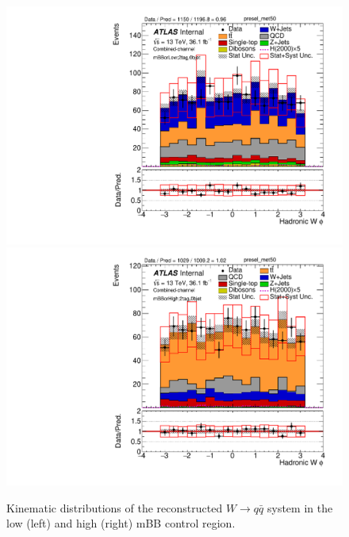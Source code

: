 \begin{figure}[!h]
\begin{center}
\includegraphics[scale=0.33]{./figures/boosted/PlotByMbbRegions/DataMC_2tag_0bjet_mbbcrLow_lepton_presel_met50_WhadPhi}                                                                             
\includegraphics[scale=0.33]{./figures/boosted/PlotByMbbRegions/DataMC_2tag_0bjet_mbbcrHigh_lepton_presel_met50_WhadPhi}                                                                            
\caption{Kinematic distributions of the reconstructed $W \to q\bar{q}$ system in the low (left) and high (right) mBB control region.}
\label{fig:boosted_mbbcrHighLow_whad}
\end{center}
\end{figure}

